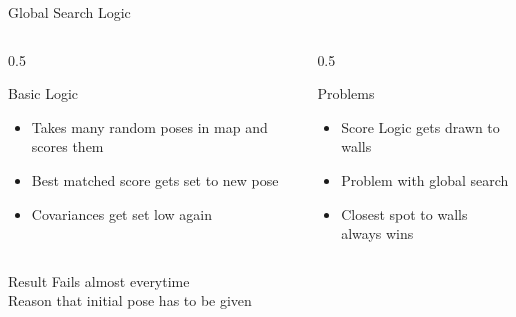 \documentclass[aspectratio=169, 11pt]{beamer}
\begin{document}
\begin{frame}{Global Search Logic}
  \begin{columns}[T]
    \begin{column}{0.5\textwidth}
      \begin{block}{Basic Logic}
          \begin{itemize}
            \item Takes many random poses in map and scores them
            \item Best matched score gets set to new pose
            \item Covariances get set low again
          \end{itemize}
      \end{block}
    \end{column}
    
    \begin{column}{0.5\textwidth}
      \begin{block}{Problems}
          \begin{itemize}
            \item Score Logic gets drawn to walls
            \item Problem with global search
            \item Closest spot to walls always wins
          \end{itemize}
      \end{block}
    \end{column}
  \end{columns}
  \begin{block}{Result}
    Fails almost everytime \\
    Reason that initial pose has to be given
  \end{block}
\end{frame}
\end{document}
